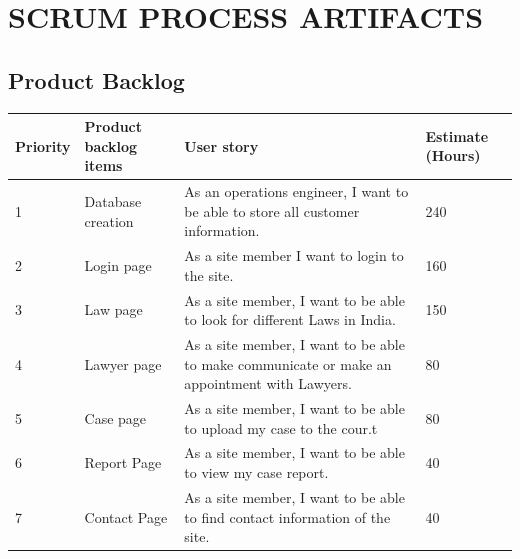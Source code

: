 \chapter{SCRUM PROCESS ARTIFACTS}
%
\section{Product Backlog}
%
%
\renewcommand{\arraystretch}{1.25}
\begin{center}
\begin{tabular}{|m{}|m{}|m{}|m{}|}
\hline
{\bf Priority} & {\bf Product backlog items} & {\bf User story} & {\bf Estimate (Hours)}\\
\hline
1 & Database creation & As an operations engineer, I want to be able to store all customer information.  & 240 \\
\hline
2 & Login page & As a site member I want to login to the site. & 160 \\
\hline
3 & Law page & As a site member, I want to be able to look for different Laws in India. & 150\\
\hline
4 & Lawyer page & As a site member, I want to be able to make communicate or make an appointment with Lawyers. & 80\\
\hline
5 & Case page &As a site member, I want to be able to upload my case to the cour.t& 80 \\
\hline
6 & Report Page & As a site member, I want to be able to view my case report. & 40\\
\hline
7 & Contact Page & As a site member,  I want to be able to find contact information of the site. & 40\\
\hline

\end{tabular}
\end{center}
%

